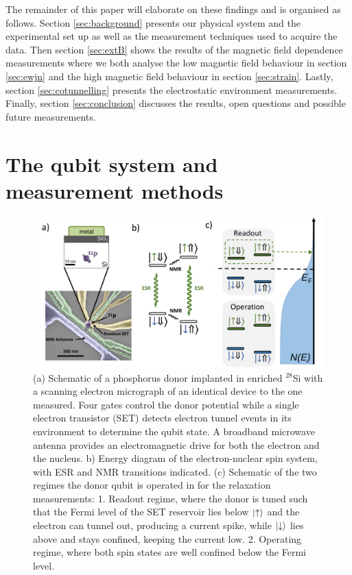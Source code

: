 The remainder of this paper will elaborate on these findings and is organised as follows. Section \ref{sec:background} presents our physical system and the experimental set up as well as the measurement techniques used to acquire the data. Then section \ref{sec:extB} shows the results of the magnetic field dependence measurements where we both analyse the low magnetic field behaviour in section \ref{sec:ewjn} and the high magnetic field behaviour in section \ref{sec:strain}. Lastly, section \ref{sec:cotunnelling} presents the electrostatic environment measurements. Finally, section \ref{sec:conclusion} discusses the results, open questions and possible future measurements. 


\section{\label{sec:background} The qubit system and measurement methods}

\begin{figure}
\centering
\includegraphics[width=\columnwidth]{figures/fig1.pdf}
\caption{
(a) Schematic of a phosphorus donor implanted in enriched $^{28}$Si with a scanning electron micrograph of an identical device to the one measured. Four gates control the donor potential while a single electron transistor (SET) detects electron tunnel events in its environment to determine the qubit state. A broadband microwave antenna provides an electromagnetic drive for both the electron and the nucleus. b) Energy diagram of the electron-nuclear spin system, with ESR and NMR transitions indicated. (c) Schematic of the two regimes the donor qubit is operated in for the relaxation measurements: 1. Readout regime, where the donor is tuned such that the Fermi level of the SET reservoir lies below $\ket{\uparrow}$ and the electron can tunnel out, producing a current spike, while $\ket{\downarrow}$ lies above and stays confined, keeping the current low. 2. Operating regime, where both spin states are well confined below the Fermi level.
}
\label{fig:device}
\end{figure}

